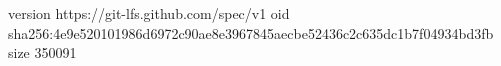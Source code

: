 version https://git-lfs.github.com/spec/v1
oid sha256:4e9e520101986d6972c90ae8e3967845aecbe52436c2c635dc1b7f04934bd3fb
size 350091
